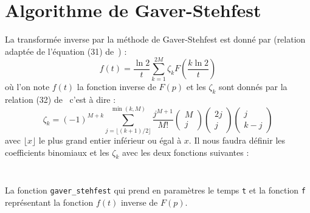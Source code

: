 \section{Algorithme de Gaver-Stehfest}
La transformée inverse par la méthode de Gaver-Stehfest est donné par 
(relation adaptée de l'équation (31) de~\cite{abate2006}) :
\[
f(t)=\dfrac{\ln{2}}{t}\sum_{k=1}^{2M}\zeta_kF\left(\dfrac{k\ln{2}}{t}\right)
\]
où l'on note $f(t)$ la fonction inverse de $F(p)$ et les $\zeta_k$ sont
donnés par la relation (32) de~\cite{abate2006} c'est à dire :
\[
\zeta_k = (-1)^{M+k} \sum_{j=\lfloor(k+1)/2\rfloor}^{\min{(k,M)}} 
\dfrac{j^{M+1}}{M!}\begin{pmatrix} M\\j  \end{pmatrix}
                   \begin{pmatrix} 2j\\j \end{pmatrix}
                   \begin{pmatrix} j\\k-j\end{pmatrix}
\]
avec $\lfloor x \rfloor$ le plus grand entier inférieur ou égal à $x$. Il 
nous faudra définir les coefficients binomiaux et les $\zeta_k$ avec les
deux fonctions suivantes :
\clearpage
\inputminted{python}{codes/python/coeff_bin-annexe_invL.py}
\inputminted{python}{codes/python/zeta-annexe_invL.py}
La fonction \texttt{gaver\_stehfest} qui prend en paramètres 
le temps \texttt{t} et la fonction \texttt{f} représentant la fonction $f(t)$ 
inverse de $F(p)$.
\inputminted{python}{codes/python/gaver_stehfest-annexe_invL.py}
